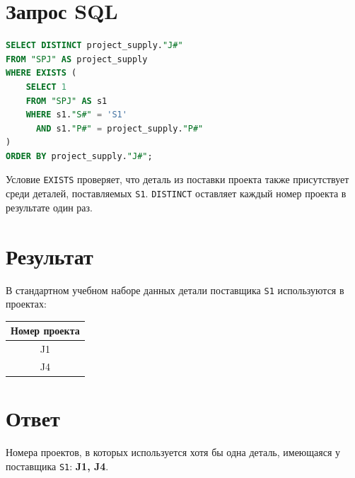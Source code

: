 \documentclass[12pt,a4paper]{article}
\begin{document}
\section*{Запрос SQL}
\begin{lstlisting}[language=SQL]
SELECT DISTINCT project_supply."J#"
FROM "SPJ" AS project_supply
WHERE EXISTS (
    SELECT 1
    FROM "SPJ" AS s1
    WHERE s1."S#" = 'S1'
      AND s1."P#" = project_supply."P#"
)
ORDER BY project_supply."J#";
\end{lstlisting}
Условие \texttt{EXISTS} проверяет, что деталь из поставки проекта также присутствует среди деталей, поставляемых \texttt{S1}. \texttt{DISTINCT} оставляет каждый номер проекта в результате один раз.

\section*{Результат}
В стандартном учебном наборе данных детали поставщика \texttt{S1} используются в проектах:
\begin{center}
\begin{tabular}{c}
\toprule
Номер проекта \\
\midrule
J1 \\
J4 \\
\bottomrule
\end{tabular}
\end{center}

\section*{Ответ}
Номера проектов, в которых используется хотя бы одна деталь, имеющаяся у поставщика \texttt{S1}: \textbf{J1, J4}.
\end{document}
